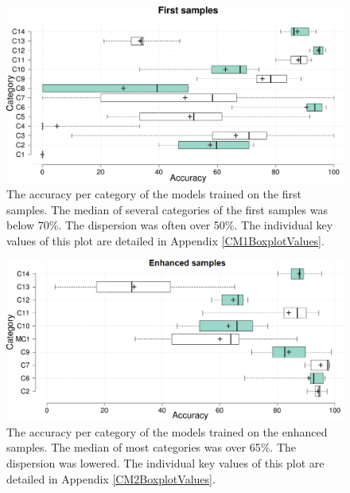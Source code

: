  \begin{figure}[]
    \centering
    \label{CM1Boxplot}
    \includegraphics[width =\textwidth]{Images/CM1Boxplot.png}
    \caption{The accuracy per category of the models trained on the first samples. The median of several categories of the first samples was below 70\%. The dispersion was often over 50\%. The individual key values of this plot are detailed in Appendix \ref{CM1BoxplotValues}.}
    \label{CM1Boxplot}
\end{figure}


 \begin{figure}[]
    \centering
    \includegraphics[width =\textwidth]{Images/CM2Boxplot.png}
    \caption{The accuracy per category of the models trained on the enhanced samples. The median of most categories was over 65\%. The dispersion was lowered. The individual key values of this plot are detailed in Appendix \ref{CM2BoxplotValues}.}
    \label{CM2Boxplot}
\end{figure}

